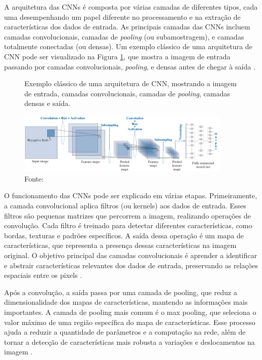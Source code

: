 A arquitetura das CNNs é composta por várias camadas de diferentes tipos, cada uma desempenhando um papel diferente no processamento e na extração de características dos dados de entrada. As principais camadas das CNNs incluem camadas convolucionais, camadas de \textit{pooling} (ou subamostragem), e camadas totalmente conectadas (ou densas). Um exemplo clássico de uma arquitetura de CNN pode ser visualizado na Figura \ref{fig:cnnexample}, que mostra a imagem de entrada passando por camadas convolucionais, \textit{pooling}, e densas antes de chegar à saída \cite{o2015introduction}.

\begin{figure}[b!]
    \centering  
    \caption{Exemplo clássico de uma arquitetura de CNN, mostrando a imagem de entrada, camadas convolucionais, camadas de \textit{pooling}, camadas densas e saída.} 
    \includegraphics[width=0.9\textwidth]{fig/cnn_example_better.png}
    \caption*{Fonte: \cite{gonzalez2018digital}}
    \label{fig:cnnexample}
\end{figure} %



O funcionamento das CNNs pode ser explicado em várias etapas. Primeiramente, a camada convolucional aplica filtros (ou kernels) aos dados de entrada. Esses filtros são pequenas matrizes que percorrem a imagem, realizando operações de convolução. Cada filtro é treinado para detectar diferentes características, como bordas, texturas e padrões específicos. A saída dessa operação é um mapa de características, que representa a presença dessas características na imagem original. O objetivo principal das camadas convolucionais é aprender a identificar e abstrair características relevantes dos dados de entrada, preservando as relações espaciais entre os pixels \cite{aggarwal2018neural}.

Após a convolução, a saída passa por uma camada de pooling, que reduz a dimensionalidade dos mapas de características, mantendo as informações mais importantes. A camada de pooling mais comum é o max pooling, que seleciona o valor máximo de uma região específica do mapa de características. Esse processo ajuda a reduzir a quantidade de parâmetros e a computação na rede, além de tornar a detecção de características mais robusta a variações e deslocamentos na imagem \cite{aggarwal2018neural}.

